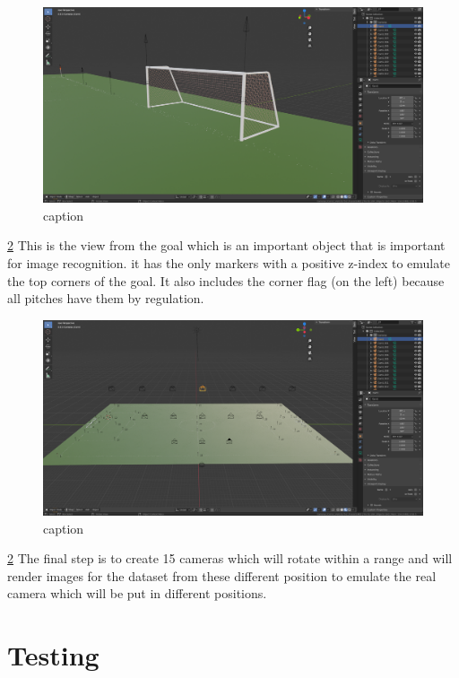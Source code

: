 \documentclass[
11pt,
twoside
]{report}
\begin{document}
\begin{figure}[H]
    \includegraphics[keepaspectratio, width=\columnwidth]{Screenshot_2022-03-05_12-47-42.png}
    \caption{caption}
    \label{img:1}
\end{figure}
\ref{img:1} This is the view from the goal which is an important object that is important for image recognition. it has the only markers with a positive z-index to emulate the top corners of the goal. It also includes the corner flag (on the left) because all pitches have them by regulation.

\begin{figure}[H]
    \includegraphics[keepaspectratio, width=\columnwidth]{Screenshot_2022-03-05_12-05-23.png}
    \caption{caption}
    \label{img:1}
\end{figure}
\ref{img:1} The final step is to create 15 cameras which will rotate within a range and will render images for the dataset from these different position to emulate the real camera which will be put in different positions.



\chapter{Testing}
\end{document}
